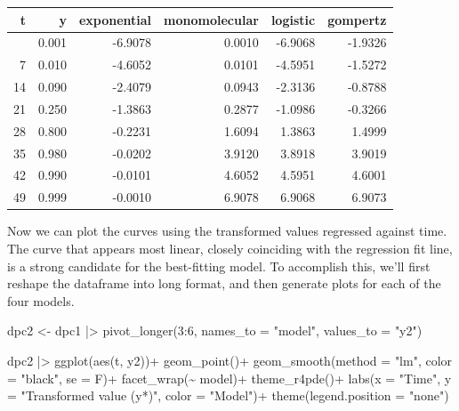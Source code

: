 \documentclass[
  letterpaper,
]{book}
\newenvironment{Shaded}{\begin{snugshade}}{\end{snugshade}}
\newcommand{\AttributeTok}[1]{\textcolor[rgb]{0.40,0.45,0.13}{#1}}
\newcommand{\DecValTok}[1]{\textcolor[rgb]{0.68,0.00,0.00}{#1}}
\newcommand{\FunctionTok}[1]{\textcolor[rgb]{0.28,0.35,0.67}{#1}}
\newcommand{\NormalTok}[1]{\textcolor[rgb]{0.00,0.23,0.31}{#1}}
\newcommand{\OtherTok}[1]{\textcolor[rgb]{0.00,0.23,0.31}{#1}}
\newcommand{\SpecialCharTok}[1]{\textcolor[rgb]{0.37,0.37,0.37}{#1}}
\newcommand{\StringTok}[1]{\textcolor[rgb]{0.13,0.47,0.30}{#1}}
\begin{document}
\begin{longtable}[]{@{}rrrrrr@{}}
\toprule\noalign{}
t & y & exponential & monomolecular & logistic & gompertz \\
\midrule\noalign{}
\endhead
\bottomrule\noalign{}
\endlastfoot
0 & 0.001 & -6.9078 & 0.0010 & -6.9068 & -1.9326 \\
7 & 0.010 & -4.6052 & 0.0101 & -4.5951 & -1.5272 \\
14 & 0.090 & -2.4079 & 0.0943 & -2.3136 & -0.8788 \\
21 & 0.250 & -1.3863 & 0.2877 & -1.0986 & -0.3266 \\
28 & 0.800 & -0.2231 & 1.6094 & 1.3863 & 1.4999 \\
35 & 0.980 & -0.0202 & 3.9120 & 3.8918 & 3.9019 \\
42 & 0.990 & -0.0101 & 4.6052 & 4.5951 & 4.6001 \\
49 & 0.999 & -0.0010 & 6.9078 & 6.9068 & 6.9073 \\
\end{longtable}

Now we can plot the curves using the transformed values regressed
against time. The curve that appears most linear, closely coinciding
with the regression fit line, is a strong candidate for the best-fitting
model. To accomplish this, we'll first reshape the dataframe into long
format, and then generate plots for each of the four models.

\begin{Shaded}
\begin{Highlighting}[]
\NormalTok{dpc2 }\OtherTok{\textless{}{-}}\NormalTok{ dpc1 }\SpecialCharTok{|\textgreater{}} 
  \FunctionTok{pivot\_longer}\NormalTok{(}\DecValTok{3}\SpecialCharTok{:}\DecValTok{6}\NormalTok{, }\AttributeTok{names\_to =} \StringTok{"model"}\NormalTok{, }\AttributeTok{values\_to =} \StringTok{"y2"}\NormalTok{) }


\NormalTok{dpc2 }\SpecialCharTok{|\textgreater{}} 
  \FunctionTok{ggplot}\NormalTok{(}\FunctionTok{aes}\NormalTok{(t, y2))}\SpecialCharTok{+}
  \FunctionTok{geom\_point}\NormalTok{()}\SpecialCharTok{+}
  \FunctionTok{geom\_smooth}\NormalTok{(}\AttributeTok{method =} \StringTok{"lm"}\NormalTok{, }\AttributeTok{color =} \StringTok{"black"}\NormalTok{, }\AttributeTok{se =}\NormalTok{ F)}\SpecialCharTok{+}
  \FunctionTok{facet\_wrap}\NormalTok{(}\SpecialCharTok{\textasciitilde{}}\NormalTok{ model)}\SpecialCharTok{+}
  \FunctionTok{theme\_r4pde}\NormalTok{()}\SpecialCharTok{+}
  \FunctionTok{labs}\NormalTok{(}\AttributeTok{x =} \StringTok{"Time"}\NormalTok{, }\AttributeTok{y =} \StringTok{"Transformed value (y*)"}\NormalTok{,}
       \AttributeTok{color =} \StringTok{"Model"}\NormalTok{)}\SpecialCharTok{+}
  \FunctionTok{theme}\NormalTok{(}\AttributeTok{legend.position =} \StringTok{"none"}\NormalTok{)}
\end{Highlighting}
\end{Shaded}
\end{document}
